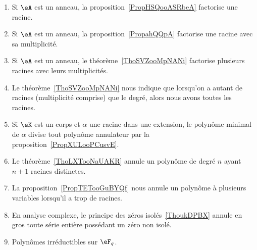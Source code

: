 \begin{description}
	      \begin{enumerate}
		      \item
		            Si \( \eA\) est un anneau, la proposition~\ref{PropHSQooASRbeA} factorise une racine.
		      \item
		            Si \( \eA\) est un anneau, la proposition~\ref{PropahQQpA} factorise une racine avec sa multiplicité.
		      \item
		            Si \( \eA\) est un anneau, le théorème~\ref{ThoSVZooMpNANi} factorise plusieurs racines avec leurs multiplicités.
		      \item
		            Le théorème~\ref{ThoSVZooMpNANi} nous indique que lorsqu'on a autant de racines (multiplicité comprise) que le degré, alors nous avons toutes les racines.
		      \item
		            Si \( \eK\) est un corps et \( \alpha\) une racine dans une extension, le polynôme minimal de \( \alpha\) divise tout polynôme annulateur par la proposition~\ref{PropXULooPCusvE}.
		      \item
		            Le théorème~\ref{ThoLXTooNaUAKR} annule un polynôme de degré \( n\) ayant \( n+1\) racines distinctes.
		      \item
		            La proposition~\ref{PropTETooGuBYQf} nous annule un polynôme à plusieurs variables lorsqu'il a trop de racines.
		      \item
		            En analyse complexe, le principe des zéros isolés~\ref{ThoukDPBX} annule en gros toute série entière possédant un zéro non isolé.
		      \item
		            Polynômes irréductibles sur \( \eF_q\).
	      \end{enumerate}

\end{description}

